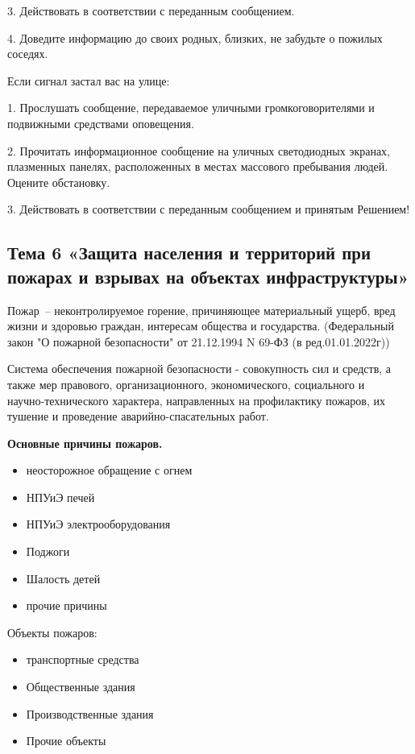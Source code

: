 \documentclass[a4paper, 12pt]{article}
\theoremstyle{definition}
\begin{document}
        3. Действовать в соответствии с переданным сообщением.

        4. Доведите информацию до своих родных, близких, не забудьте о пожилых соседях. 

        Если сигнал застал вас на улице:
        
        1. Прослушать сообщение, передаваемое уличными громкоговорителями и подвижными средствами оповещения.

        2. Прочитать информационное сообщение на уличных светодиодных экранах, плазменных панелях, расположенных в местах массового пребывания людей. Оцените обстановку.

        3. Действовать в соответствии с переданным сообщением и принятым Решением!

        \subsection{Тема 6 
        «Защита населения и территорий при пожарах и взрывах на объектах инфраструктуры»}

        Пожар – неконтролируемое горение, причиняющее материальный ущерб, вред жизни и здоровью граждан, интересам общества и государства. (Федеральный закон "О пожарной безопасности" от 21.12.1994 N 69-ФЗ (в ред.01.01.2022г))

        Система обеспечения пожарной безопасности - совокупность сил и средств, а также мер правового, организационного, экономического, социального и \\научно-технического характера, направленных на профилактику пожаров, их тушение и проведение аварийно-спасательных работ.

        \begin{center}
            \textbf{Основные причины пожаров.} 
        \end{center}
        \begin{itemize}
            \item неосторожное обращение с огнем
            \item НПУиЭ печей
            \item  НПУиЭ электрооборудования
            \item Поджоги
            \item Шалость детей
            \item прочие причины
        \end{itemize}
        
        Объекты пожаров:
        \begin{itemize}
            \item транспортные средства
            \item Общественные здания
            \item Производственные здания
            \item Прочие объекты
        \end{itemize}
        
\end{document}
